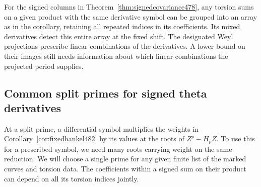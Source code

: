 \documentclass[a4paper,11pt]{article}
\theoremstyle{definition}
\theoremstyle{remark}
\numberwithin{equation}{section}
\begin{document}
For the signed columns in Theorem~\ref{thm:signedcovariance478},
any torsion sums on a given product with the same derivative
symbol can be grouped into an array as in the corollary, retaining
all repeated indices in its coefficients. Its mixed derivatives
detect this entire array at the fixed shift. The designated Weyl
projections prescribe linear combinations of the derivatives. A
lower bound on their images still needs information about which
linear combinations the projected period supplies.


\subsection{Common split primes for signed theta derivatives}
\label{sec:commonsplit483}

At a split prime, a differential symbol multiplies the weights
in Corollary~\ref{cor:fixedhankel482} by its values at the
roots of \(Z^p-H_pZ\). To use this for a prescribed symbol, we
need many roots carrying weight on the same reduction. We will
choose a single prime for any given finite list of the marked
curves and torsion data. The coefficients within a signed sum
on their product can depend on all its torsion indices jointly.
\end{document}
